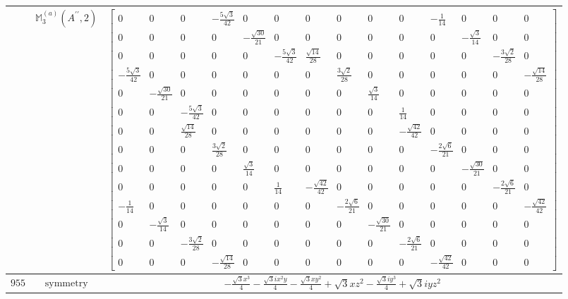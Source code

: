 \documentclass[fleqn,8pt,landscape]{jsarticle}
\begin{document}
\begin{longtable}{ccc}
$  $ & $ \mathbb{M}_{3}^{(a)}(A^{\prime\prime},2) $ & $ \begin{bmatrix} 0 & 0 & 0 & - \frac{5 \sqrt{3}}{42} & 0 & 0 & 0 & 0 & 0 & 0 & - \frac{1}{14} & 0 & 0 & 0 \\ 0 & 0 & 0 & 0 & - \frac{\sqrt{30}}{21} & 0 & 0 & 0 & 0 & 0 & 0 & - \frac{\sqrt{3}}{14} & 0 & 0 \\ 0 & 0 & 0 & 0 & 0 & - \frac{5 \sqrt{3}}{42} & \frac{\sqrt{14}}{28} & 0 & 0 & 0 & 0 & 0 & - \frac{3 \sqrt{2}}{28} & 0 \\ - \frac{5 \sqrt{3}}{42} & 0 & 0 & 0 & 0 & 0 & 0 & \frac{3 \sqrt{2}}{28} & 0 & 0 & 0 & 0 & 0 & - \frac{\sqrt{14}}{28} \\ 0 & - \frac{\sqrt{30}}{21} & 0 & 0 & 0 & 0 & 0 & 0 & \frac{\sqrt{3}}{14} & 0 & 0 & 0 & 0 & 0 \\ 0 & 0 & - \frac{5 \sqrt{3}}{42} & 0 & 0 & 0 & 0 & 0 & 0 & \frac{1}{14} & 0 & 0 & 0 & 0 \\ 0 & 0 & \frac{\sqrt{14}}{28} & 0 & 0 & 0 & 0 & 0 & 0 & - \frac{\sqrt{42}}{42} & 0 & 0 & 0 & 0 \\ 0 & 0 & 0 & \frac{3 \sqrt{2}}{28} & 0 & 0 & 0 & 0 & 0 & 0 & - \frac{2 \sqrt{6}}{21} & 0 & 0 & 0 \\ 0 & 0 & 0 & 0 & \frac{\sqrt{3}}{14} & 0 & 0 & 0 & 0 & 0 & 0 & - \frac{\sqrt{30}}{21} & 0 & 0 \\ 0 & 0 & 0 & 0 & 0 & \frac{1}{14} & - \frac{\sqrt{42}}{42} & 0 & 0 & 0 & 0 & 0 & - \frac{2 \sqrt{6}}{21} & 0 \\ - \frac{1}{14} & 0 & 0 & 0 & 0 & 0 & 0 & - \frac{2 \sqrt{6}}{21} & 0 & 0 & 0 & 0 & 0 & - \frac{\sqrt{42}}{42} \\ 0 & - \frac{\sqrt{3}}{14} & 0 & 0 & 0 & 0 & 0 & 0 & - \frac{\sqrt{30}}{21} & 0 & 0 & 0 & 0 & 0 \\ 0 & 0 & - \frac{3 \sqrt{2}}{28} & 0 & 0 & 0 & 0 & 0 & 0 & - \frac{2 \sqrt{6}}{21} & 0 & 0 & 0 & 0 \\ 0 & 0 & 0 & - \frac{\sqrt{14}}{28} & 0 & 0 & 0 & 0 & 0 & 0 & - \frac{\sqrt{42}}{42} & 0 & 0 & 0 \end{bmatrix} $ \\ \hline
$ 955 $ & $ \text{symmetry} $ & $ - \frac{\sqrt{3} x^{3}}{4} - \frac{\sqrt{3} i x^{2} y}{4} - \frac{\sqrt{3} x y^{2}}{4} + \sqrt{3} x z^{2} - \frac{\sqrt{3} i y^{3}}{4} + \sqrt{3} i y z^{2} $ \\

\end{longtable}
\end{document}
